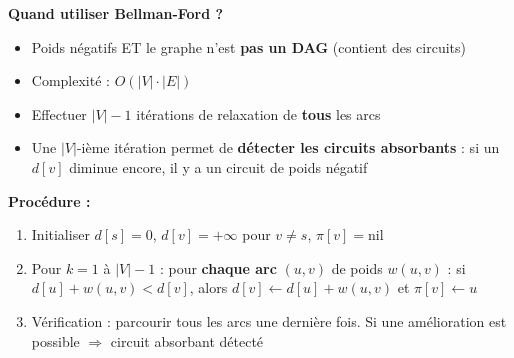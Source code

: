 \documentclass[12pt,a4paper]{article}
\begin{document}
\begin{methode}
\textbf{Quand utiliser Bellman-Ford ?}
\begin{itemize}[nosep]
    \item Poids n\'egatifs ET le graphe n'est \textbf{pas un DAG} (contient des circuits)
    \item Complexit\'e : $O(|V| \cdot |E|)$
    \item Effectuer $|V|-1$ it\'erations de relaxation de \textbf{tous} les arcs
    \item Une $|V|$-i\`eme it\'eration permet de \textbf{d\'etecter les circuits absorbants} : si un $d[v]$ diminue encore, il y a un circuit de poids n\'egatif
\end{itemize}

\textbf{Proc\'edure :}
\begin{enumerate}[nosep]
    \item Initialiser $d[s] = 0$, $d[v] = +\infty$ pour $v \neq s$, $\pi[v] = \text{nil}$
    \item Pour $k = 1$ \`a $|V|-1$ : pour \textbf{chaque arc} $(u,v)$ de poids $w(u,v)$ : si $d[u] + w(u,v) < d[v]$, alors $d[v] \leftarrow d[u] + w(u,v)$ et $\pi[v] \leftarrow u$
    \item V\'erification : parcourir tous les arcs une derni\`ere fois. Si une am\'elioration est possible $\Rightarrow$ circuit absorbant d\'etect\'e
\end{enumerate}
\end{methode}
\end{document}
